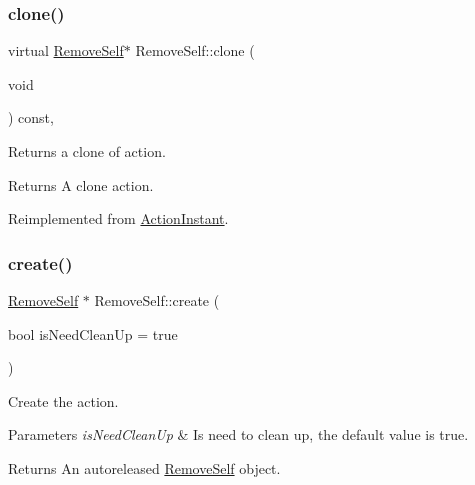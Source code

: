 \subsubsection{\texorpdfstring{clone()}{clone()}\hspace{0.1cm}{\footnotesize\ttfamily [2/2]}}
{\footnotesize\ttfamily virtual \hyperlink{classRemoveSelf}{Remove\+Self}$\ast$ Remove\+Self\+::clone (\begin{DoxyParamCaption}\item[{void}]{ }\end{DoxyParamCaption}) const\hspace{0.3cm}{\ttfamily [override]}, {\ttfamily [virtual]}}

Returns a clone of action.

\begin{DoxyReturn}{Returns}
A clone action. 
\end{DoxyReturn}


Reimplemented from \hyperlink{classActionInstant_adb76fc6f006098109e8256210cbd8cc0}{Action\+Instant}.

\mbox{\label{classRemoveSelf_abd40e3eebd18907ec5b885bf2522ff77}} 
\subsubsection{\texorpdfstring{create()}{create()}\hspace{0.1cm}{\footnotesize\ttfamily [1/2]}}
{\footnotesize\ttfamily \hyperlink{classRemoveSelf}{Remove\+Self} $\ast$ Remove\+Self\+::create (\begin{DoxyParamCaption}\item[{bool}]{is\+Need\+Clean\+Up = {\ttfamily true} }\end{DoxyParamCaption})\hspace{0.3cm}{\ttfamily [static]}}

Create the action.


\begin{DoxyParams}{Parameters}
{\em is\+Need\+Clean\+Up} & Is need to clean up, the default value is true. \\
\hline
\end{DoxyParams}
\begin{DoxyReturn}{Returns}
An autoreleased \hyperlink{classRemoveSelf}{Remove\+Self} object. 
\end{DoxyReturn}
\mbox{\label{classRemoveSelf_a916d03f7a5c95c76f9450a3090d0b9ad}} 
